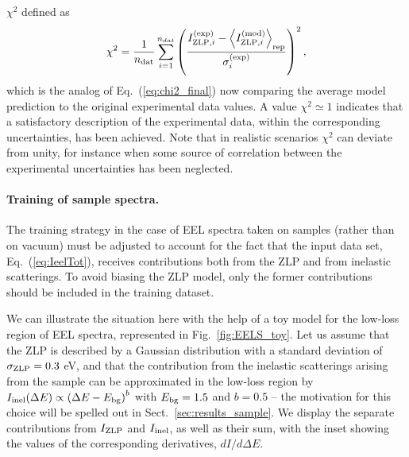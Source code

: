 $\chi^2$ defined as
\begin{equation}
  \label{eq:chi2_final}
\begin{centering}
  \chi^2 = \frac{1}{n_{\rm dat}}\sum_{i=1}^{n_{dat}}\left(\frac{ I_{{\rm ZLP},i}^{{\rm (exp)}} -
 \la I_{{\rm ZLP},i}^{{\rm (mod)}}\ra_{\rm rep} }{\sigma_i^{(\rm exp)}}\right)^2, 
\end{centering}
\end{equation}
which is the analog of Eq.~(\ref{eq:chi2_final}) now comparing the average model prediction
to the original experimental data values.
%
A value $\chi^2 \simeq 1$ indicates that a satisfactory description of the experimental data,
within the corresponding uncertainties, has been achieved.
%
Note that in realistic scenarios $\chi^2$ can deviate from unity, for instance when
some source of correlation between the experimental uncertainties has been neglected.

\paragraph{Training of sample spectra.}

The training strategy in the case of EEL spectra taken on samples (rather than on vacuum) must be adjusted
to account for the fact that the input data set, Eq.~(\ref{eq:IeelTot}), receives contributions
both from the ZLP and from inelastic scatterings.
%
To avoid biasing the ZLP model, only the former contributions should be
included in the training dataset.

We can illustrate the situation here with the help of a toy model for the low-loss
region of EEL spectra, represented in
Fig.~\ref{fig:EELS_toy}.
%
Let us assume that the ZLP is described by a Gaussian distribution with a standard deviation of $\sigma_{\rm ZLP}=0.3$ eV,
and that the contribution from the
inelastic scatterings arising from the sample can be approximated in the low-loss
region by $I_{\rm inel}(\Delta E)\propto \left( \Delta E - E_{\rm bg}\right)^b$ with $E_{\rm bg}=1.5$
and $b=0.5$ -- the motivation for this
choice will be spelled out in Sect.~\ref{sec:results_sample}.
%
We display the separate contributions from $I_{\rm ZLP}$
and $I_{\rm inel}$, as well as their sum, 
with the inset showing the values of the corresponding derivatives, $dI/d\Delta E$.

